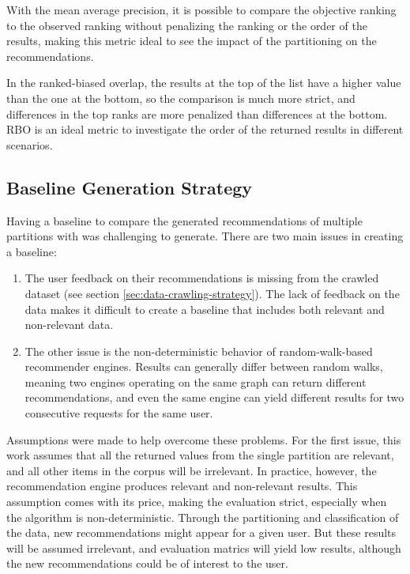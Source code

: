 With the mean average precision, it is possible to compare the objective ranking to the observed ranking without penalizing the ranking or the order of the results, making this metric ideal to see the impact of the partitioning on the recommendations.


In the ranked-biased overlap, the results at the top of the list have a higher value than the one at the bottom, so the comparison is much more strict, and differences in the top ranks are more penalized than differences at the bottom. RBO is an ideal metric to investigate the order of the returned results in different scenarios.


\subsection{Baseline Generation Strategy}
\label{subsec:baseline-generation}
Having a baseline to compare the generated recommendations of multiple partitions with was challenging to generate. There are two main issues in creating a baseline:
\begin{enumerate}
    \item The user feedback on their recommendations is missing from the crawled dataset (see section \ref{sec:data-crawling-strategy}). The lack of feedback on the data makes it difficult to create a baseline that includes both relevant and non-relevant data.
    
    \item The other issue is the non-deterministic behavior of random-walk-based recommender engines. Results can generally differ between random walks, meaning two engines operating on the same graph can return different recommendations, and even the same engine can yield different results for two consecutive requests for the same user.
\end{enumerate}

Assumptions were made to help overcome these problems. For the first issue, this work assumes that all the returned values from the single partition are relevant, and all other items in the corpus will be irrelevant. In practice, however, the recommendation engine produces relevant and non-relevant results. This assumption comes with its price, making the evaluation strict, especially when the algorithm is non-deterministic. Through the partitioning and classification of the data, new recommendations might appear for a given user. But these results will be assumed irrelevant, and evaluation matrics will yield low results, although the new recommendations could be of interest to the user.


